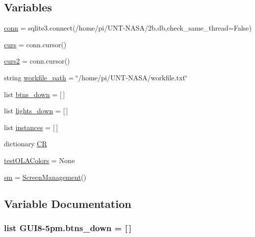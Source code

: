 \subsection*{Variables}
\begin{DoxyCompactItemize}
\item 
\hyperlink{namespaceGUI8-5pm_a754cc5d2663b1ceb611c13b8e4ec91ad}{conn} = sqlite3.\+connect(\textquotesingle{}/home/pi/U\+NT-\/N\+A\+SA/2b.\+db\textquotesingle{},check\+\_\+same\+\_\+thread=\+False)
\item 
\hyperlink{namespaceGUI8-5pm_adfad6340169cdc0fa55a47953d6320a0}{curs} = conn.\+cursor()
\item 
\hyperlink{namespaceGUI8-5pm_acbb42dfb89c49147b15b0355fa744c45}{curs2} = conn.\+cursor()
\item 
string \hyperlink{namespaceGUI8-5pm_a508b4e6132ee7dc30a64d3138ca931f1}{workfile\+\_\+path} = \char`\"{}/home/pi/U\+NT-\/N\+A\+SA/workfile.\+txt\char`\"{}
\item 
list \hyperlink{namespaceGUI8-5pm_a90613e2e5dbe99c084c15b8d8d7d83fa}{btns\+\_\+down} = \mbox{[}$\,$\mbox{]}
\item 
list \hyperlink{namespaceGUI8-5pm_a2d5665b7141552d71c310888d41efbd7}{lights\+\_\+down} = \mbox{[}$\,$\mbox{]}
\item 
list \hyperlink{namespaceGUI8-5pm_ac6f3b5abf90a01b9e7266f0ebbc1b5e8}{instances} = \mbox{[}$\,$\mbox{]}
\item 
dictionary \hyperlink{namespaceGUI8-5pm_a14d7ab1cf4721110f93f3f0b29286697}{CR}
\item 
\hyperlink{namespaceGUI8-5pm_ab68e1f0d94f4a00210276fed699faaf7}{test\+O\+L\+A\+Colors} = None
\item 
\hyperlink{namespaceGUI8-5pm_a6e831d571cc3bc2fd29a3c47972ede7d}{sm} = \hyperlink{classGUI8-5pm_1_1ScreenManagement}{Screen\+Management}()
\end{DoxyCompactItemize}


\subsection{Variable Documentation}
\subsubsection[{\texorpdfstring{btns\+\_\+down}{btns_down}}]{\setlength{\rightskip}{0pt plus 5cm}list G\+U\+I8-\/5pm.\+btns\+\_\+down = \mbox{[}$\,$\mbox{]}}\hypertarget{namespaceGUI8-5pm_a90613e2e5dbe99c084c15b8d8d7d83fa}{}\label{namespaceGUI8-5pm_a90613e2e5dbe99c084c15b8d8d7d83fa}
